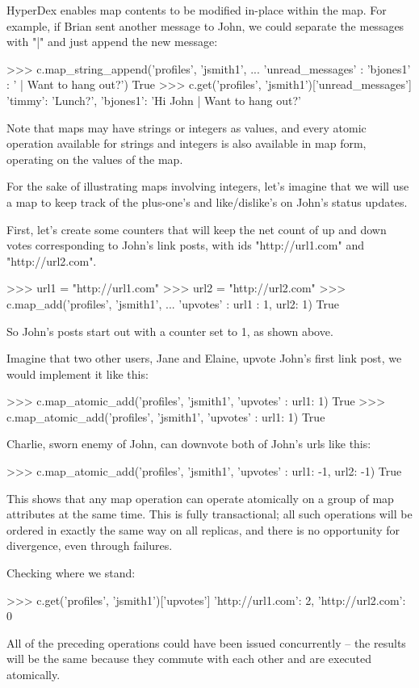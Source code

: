 HyperDex enables map contents to be modified in-place within the map.  For
example, if Brian sent another message to John, we could separate the messages
with "|" and just append the new message:

\begin{pythoncode}
>>> c.map_string_append('profiles', 'jsmith1',
...                      {'unread_messages' : {'bjones1' : ' | Want to hang out?'}})
True
>>> c.get('profiles', 'jsmith1')['unread_messages']
{'timmy': 'Lunch?', 'bjones1': 'Hi John | Want to hang out?'}
\end{pythoncode}

Note that maps may have strings or integers as values, and every atomic
operation available for strings and integers is also available in map form,
operating on the values of the map.

For the sake of illustrating maps involving integers, let's imagine that we will
use a map to keep track of the plus-one's and like/dislike's on John's status
updates. 

First, let's create some counters that will keep the net count of up and down
votes corresponding to John's link posts, with ids "http://url1.com" and
"http://url2.com". 

\begin{pythoncode}
>>> url1 = "http://url1.com"
>>> url2 = "http://url2.com"
>>> c.map_add('profiles', 'jsmith1',
...           {'upvotes' : {url1 : 1, url2: 1}})
True
\end{pythoncode}

So John's posts start out with a counter set to 1, as shown above. 

Imagine that two other users, Jane and Elaine, upvote John's first link post, we
would implement it like this:

\begin{pythoncode}
>>> c.map_atomic_add('profiles', 'jsmith1', {'upvotes' : {url1: 1}})
True
>>> c.map_atomic_add('profiles', 'jsmith1', {'upvotes' : {url1: 1}})
True
\end{pythoncode}

Charlie, sworn enemy of John, can downvote both of John's urls like this:

\begin{pythoncode}
>>> c.map_atomic_add('profiles', 'jsmith1', {'upvotes' : {url1: -1, url2: -1}})
True
\end{pythoncode}

This shows that any map operation can operate atomically on a group of map
attributes at the same time. This is fully transactional; all such operations
will be ordered in exactly the same way on all replicas, and there is no
opportunity for divergence, even through failures.

Checking where we stand:

\begin{pythoncode}
>>> c.get('profiles', 'jsmith1')['upvotes']
{'http://url1.com': 2, 'http://url2.com': 0}
\end{pythoncode}

All of the preceding operations could have been issued concurrently -- the
results will be the same because they commute with each other and are executed
atomically.
